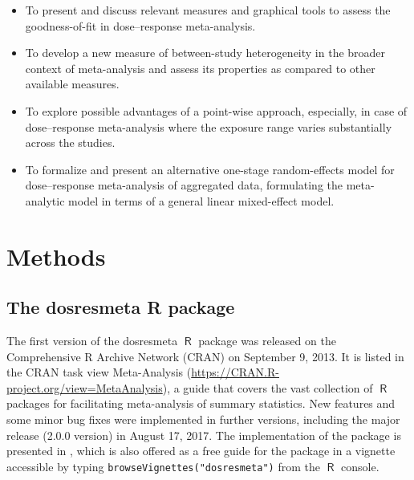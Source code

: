 \documentclass[11pt,a4paper,twoside,openany]{book}\usepackage{knitr}
\newcommand{\pkg}[1]{{\fontseries{b}\selectfont #1}}
\DeclareMathOperator{\R}{\textsf{R}}
\begin{document}
{\begin{itemize}
\item To present and discuss relevant measures and graphical tools to assess the goodness-of-fit in dose--response meta-analysis.

\item To develop a new measure of between-study heterogeneity in the broader context of meta-analysis and assess its properties as compared to other available measures. 

\item To explore possible advantages of a point-wise approach, especially, in case of dose--response meta-analysis where the exposure range varies substantially across the studies.

\item To formalize and present an alternative one-stage random-effects model for dose--response meta-analysis of aggregated data, formulating the meta-analytic model in terms of a general linear mixed-effect model. 

\end{itemize}


%

\chapter{Methods}

\section{The \pkg{dosresmeta} \textsf{R} package}

The first version of the \pkg{dosresmeta} $\R$ package was released on the Comprehensive R Archive Network (CRAN) on September 9, 2013. It is listed in the CRAN task view Meta-Analysis (\url{https://CRAN.R-project.org/view=MetaAnalysis}), a guide that covers the vast collection of $\R$ packages for facilitating meta-analysis of summary statistics.
New features and some minor bug fixes were implemented in further versions, including the major release (2.0.0 version) in August 17, 2017. The implementation of the package is presented in , which is also offered as a free guide for the package in a vignette accessible by typing \texttt{browseVignettes("dosresmeta")} from the $\R$ console.

}
\end{document}

